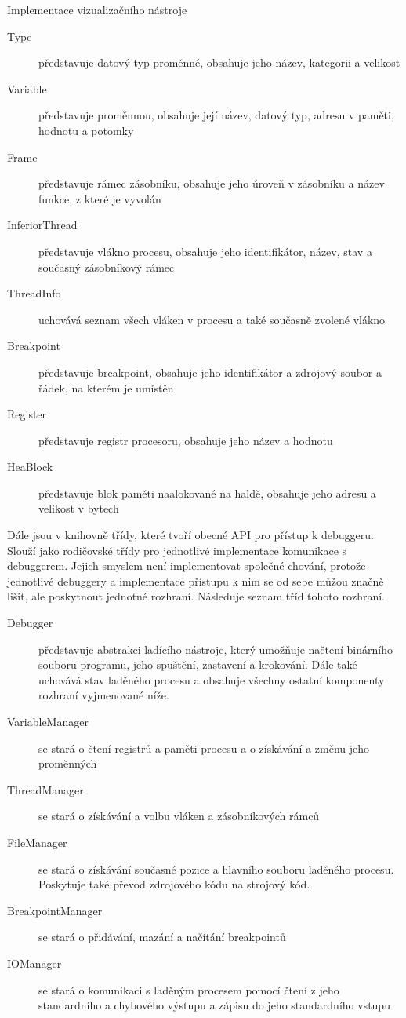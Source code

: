 \documentclass[czech,bachelor,male,python,dept460]{diploma}						%
\newcommand{\parspace}[1][]{
	\ifthenelse{\isempty{#1}}{\vspace{5mm}}{\vspace{#1}}
	\par
}
\begin{document}
\begin{section}{Implementace vizualizačního nástroje}
		\begin{description}
			\item[Type] představuje datový typ proměnné, obsahuje jeho název, kategorii a velikost
			\item[Variable] představuje proměnnou, obsahuje její název, datový typ, adresu v paměti, hodnotu a potomky
			\item[Frame] představuje rámec zásobníku, obsahuje jeho úroveň v zásobníku a název funkce, z které je vyvolán
			\item[InferiorThread] představuje vlákno procesu, obsahuje jeho identifikátor, název, stav a současný zásobníkový rámec
			\item[ThreadInfo] uchovává seznam všech vláken v procesu a také současně zvolené vlákno
			\item[Breakpoint] představuje breakpoint, obsahuje jeho identifikátor a zdrojový soubor a řádek, na kterém je umístěn
			\item[Register] představuje registr procesoru, obsahuje jeho název a hodnotu
			\item[HeaBlock] představuje blok paměti naalokované na haldě, obsahuje jeho adresu a velikost v bytech
		\end{description}
		
		\parspace Dále jsou v knihovně třídy, které tvoří obecné API pro přístup k debuggeru. Slouží jako rodičovské třídy pro jednotlivé implementace
		komunikace s debuggerem. Jejich smyslem není implementovat společné chování, protože jednotlivé debuggery a implementace přístupu k nim
		se od sebe můžou značně lišit, ale poskytnout jednotné rozhraní. Následuje seznam tříd tohoto rozhraní.
		
		\begin{description}
			\item[Debugger] představuje abstrakci ladícího nástroje, který umožňuje načtení binárního souboru programu, jeho spuštění, zastavení
			a krokování. Dále také uchovává stav laděného procesu a obsahuje všechny ostatní komponenty rozhraní vyjmenované níže.
			\item[VariableManager] se stará o čtení registrů a paměti procesu a o získávání a změnu jeho proměnných
			\item[ThreadManager] se stará o získávání a volbu vláken a zásobníkových rámců
			\item[FileManager] se stará o získávání současné pozice a hlavního souboru laděného procesu. Poskytuje také převod zdrojového kódu
			na strojový kód.
			\item[BreakpointManager] se stará o přidávání, mazání a načítání breakpointů
			\item[IOManager] se stará o komunikaci s laděným procesem pomocí čtení z jeho standardního a chybového výstupu a zápisu do jeho standardního vstupu
		\end{description}
		

\end{section}
\end{document}
